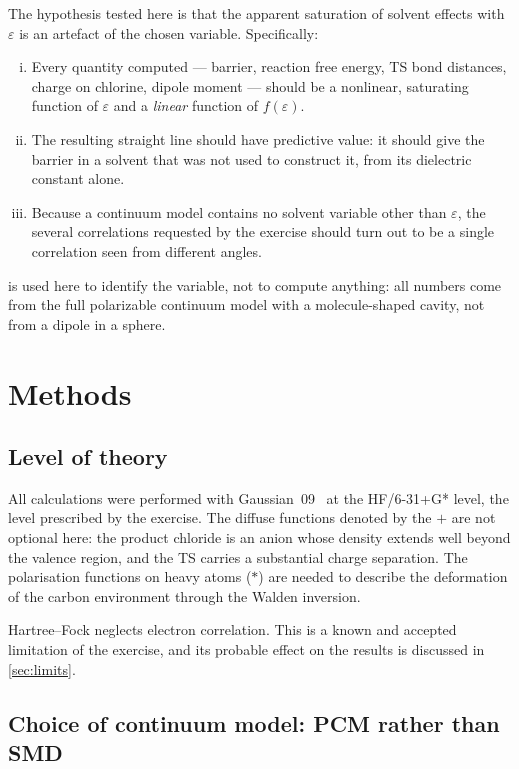 \documentclass[10pt,a4paper]{article}
\begin{document}
The hypothesis tested here is that the apparent saturation of solvent effects with
$\varepsilon$ is an artefact of the chosen variable. Specifically:

\begin{enumerate}[(i)]
  \item Every quantity computed --- barrier, reaction free energy, TS bond
    distances, charge on chlorine, dipole moment --- should be a nonlinear,
    saturating function of $\varepsilon$ and a \emph{linear} function of
    $f(\varepsilon)$.
  \item The resulting straight line should have predictive value: it should give
    the barrier in a solvent that was not used to construct it, from its dielectric
    constant alone.
  \item Because a continuum model contains no solvent variable other than
    $\varepsilon$, the several correlations requested by the exercise should turn
    out to be a single correlation seen from different angles.
\end{enumerate}

 is used here to identify the variable, not to compute anything:
all numbers come from the full polarizable continuum model with a molecule-shaped
cavity, not from a dipole in a sphere.

\section{Methods}

\subsection{Level of theory}

All calculations were performed with Gaussian~09~\cite{gaussian09} at the
HF/6-31+G* level, the level prescribed by the exercise. The diffuse functions
denoted by the $+$ are not optional here: the product chloride is an anion whose
density extends well beyond the valence region, and the TS carries a substantial
charge separation. The polarisation functions on heavy atoms ($*$) are needed to
describe the deformation of the carbon environment through the Walden inversion.

Hartree--Fock neglects electron correlation. This is a known and accepted
limitation of the exercise, and its probable effect on the results is discussed in
\cref{sec:limits}.

\subsection{Choice of continuum model: PCM rather than SMD}
\end{document}
